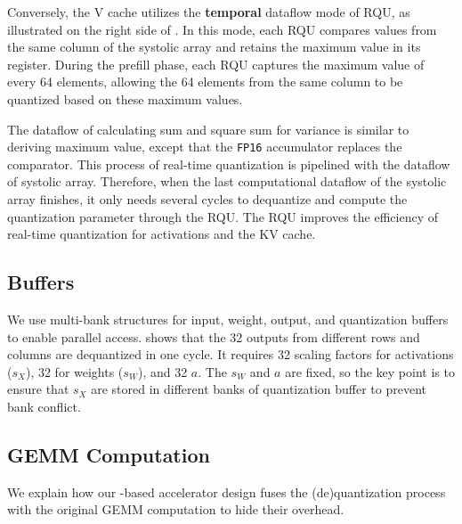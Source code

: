 Conversely, the V cache utilizes the \textbf{temporal} dataflow mode of RQU, as illustrated on the right side of . 
In this mode, each RQU compares values from the same column of the systolic array and retains the maximum value in its register. 
During the prefill phase, each RQU captures the maximum value of every 64 elements, allowing the 64 elements from the same column to be quantized based on these maximum values.

The dataflow of calculating sum and square sum for variance is similar to deriving maximum value, except that the \texttt{FP16} accumulator replaces the comparator.
This process of real-time quantization is pipelined with the dataflow of systolic array.
Therefore, when the last computational dataflow of the systolic array finishes, it only needs several cycles to dequantize and compute the quantization parameter through the RQU.
The RQU improves the efficiency of real-time quantization for activations and the KV cache.



\subsection{Buffers}

We use multi-bank structures for input, weight, output, and quantization buffers to enable parallel access.
 shows that the 32 outputs from different rows and columns are dequantized in one cycle. 
It requires 32 scaling factors for activations ($s_X$), 32 for weights ($s_W$), and 32 $a$.
The $s_W$ and $a$ are fixed, so the key point is to ensure that $s_X$ are stored in different banks of quantization buffer to prevent bank conflict.



\subsection{GEMM Computation}
\label{sec:quant_dequant}


We explain how our \proj{}-based accelerator design fuses the (de)quantization process with the original GEMM computation to hide their overhead.




